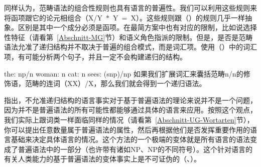 同样认为，范畴语法\indexcg 的组合性规则也具有语言的普遍性。我们可以利用这些规则来将函项跟它的论元相组合（\mbox{X/Y $*$ Y = X}）。这些规则跟（）的规则几乎一样抽象。区别是其中一个成分必须是函项。在最简方案\indexmp 中也有对应的限制，比如说选择性特征（请看第~\ref{Abschnitt-MG}节）和语义角色指派的限制。但是，是否是范畴语法允准了递归结构并不取决于普遍的组合模式，而是词汇项。使用（）中的词汇项，有可能分析两个句子，并且一定不会构建递归的结构。

\eal
\ex the: np/n
\ex woman: n
\ex cat: n
\ex sees: (s\bs np)/np
\zl
如果我们扩展词汇来囊括范畴n/n的修饰语，范畴的连词（X\bs X）/X，那么我们就会得到一个递归语法。

\citet*[]{FHC2005a}指出，不允准递归结构的语言事实对于基于普遍语法的理论来说并不是一个问题，因为并不是普遍语法的所有可能性都能够通过具体的语言来应用。按照这个观点，我们实际上跟词类一样面临同样的情况（请看第~\ref{Abschnitt-UG-Wortarten}节），你可以提出任意数量属于普遍语法的属性，然后再根据他们是否发挥重要作用的语言基础来决定具体语言的情况。这个方法的一个极端的变体就是所有语言的语法变成了普遍语法中的一部分（也许带有诸如NP、NP的不同符号）。这个针对语言的有关人类能力的基于普遍语法的变体事实上是不可证伪的（\citealp[, 443]{EL2009a}、\citealp[]{Tomasello2009a}）。

